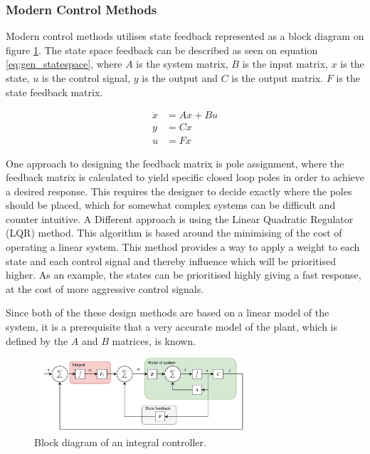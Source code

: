 \documentclass[../../main.tex]{subfiles}
\begin{document}
\subsubsection*{Modern Control Methods}
Modern control methods utilises state feedback represented as a block diagram on figure \ref{fig:Integral_Diagram}. The state space feedback can be described as seen on equation \ref{eq:gen_statespace}, where $A$ is the system matrix, $B$ is the input matrix, $x$ is the state, $u$ is the control signal, $y$ is the output and $C$ is the output matrix. $F$ is the state feedback matrix. 

\begin{equation}\label{eq:gen_statespace}
    \begin{split}
        \Dot{x}&=Ax+Bu \\
        y&=Cx \\
        u&=Fx
    \end{split}
\end{equation}

One approach to designing the feedback matrix is pole assignment, where the feedback matrix is calculated to yield specific closed loop poles in order to achieve a desired response. This requires the designer to decide exactly where the poles should be placed, which for somewhat complex systems can be difficult and counter intuitive.
A Different approach is using the Linear Quadratic Regulator (LQR) method. This algorithm is based around the minimising of the cost of operating a linear system. This method provides a way to apply a weight to each state and each control signal and thereby influence which will be prioritised higher. As an example, the states can be prioritised highly giving a fast response, at the cost of more aggressive control signals.

Since both of the these design methods are based on a linear model of the system, it is a prerequisite that a very accurate model of the plant, which is defined by the $A$ and $B$ matrices, is known. 

\begin{figure}
    \centering
    \includegraphics[width=0.7\textwidth]{Sections/Miscellaneous/Images/Statefeedback_Integral.pdf}
    \caption{Block diagram of an integral controller.}
    \label{fig:Integral_Diagram}
\end{figure}
\end{document}
